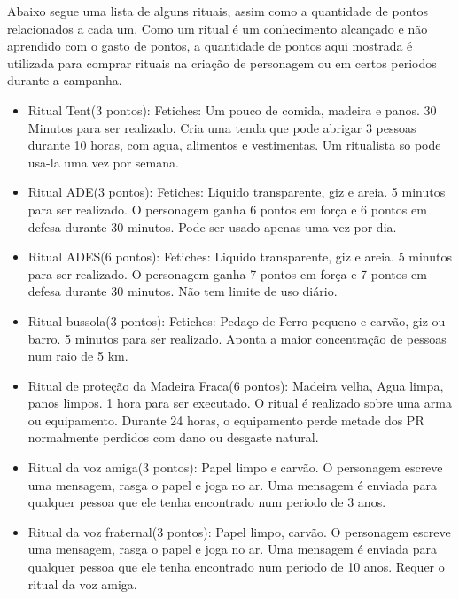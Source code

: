 Abaixo segue uma lista de alguns rituais, assim como a quantidade de pontos relacionados a cada um. Como um ritual é um conhecimento alcançado e não aprendido com o gasto de pontos, a quantidade de pontos aqui mostrada é utilizada para comprar rituais na criação de personagem ou em certos periodos durante a campanha. 

 
\begin{itemize}
	\item Ritual Tent(3 pontos): Fetiches: Um pouco de comida, madeira e panos. 30 Minutos para ser realizado. Cria uma tenda que pode abrigar 3 pessoas durante 10 horas, com agua, alimentos e vestimentas. Um ritualista so pode usa-la uma vez por semana.
 
 	\item Ritual ADE(3 pontos): Fetiches: Liquido transparente, giz e areia. 5 minutos para ser realizado. O personagem ganha 6 pontos em força e 6 pontos em defesa durante 30 minutos. Pode ser usado apenas uma vez por dia.
 
 	\item Ritual ADES(6 pontos): Fetiches: Liquido transparente, giz e areia. 5 minutos para ser realizado. O personagem ganha 7 pontos em força e 7 pontos em defesa durante 30 minutos. Não tem limite de uso diário.
 
 	\item Ritual bussola(3 pontos): Fetiches: Pedaço de Ferro pequeno e carvão, giz ou barro. 5 minutos para ser realizado. Aponta a maior concentração de pessoas num raio de 5 km.
 
 	\item Ritual de proteção da Madeira Fraca(6 pontos): Madeira velha, Agua limpa, panos limpos. 1 hora para ser executado. O ritual é realizado
 sobre uma arma ou equipamento. Durante 24 horas, o equipamento perde metade dos PR normalmente perdidos com dano ou desgaste natural.
 
 	\item Ritual da voz amiga(3 pontos): Papel limpo e carvão. O personagem escreve uma mensagem, rasga o papel e joga no ar. Uma mensagem é enviada para qualquer pessoa que ele tenha encontrado num periodo de 3 anos. 
 
 	\item Ritual da voz fraternal(3 pontos): Papel limpo, carvão. O personagem escreve uma mensagem, rasga o papel e joga no ar. Uma mensagem é enviada para qualquer pessoa que ele tenha encontrado num periodo de 10 anos. Requer o ritual da voz amiga.
 

\end{itemize}
